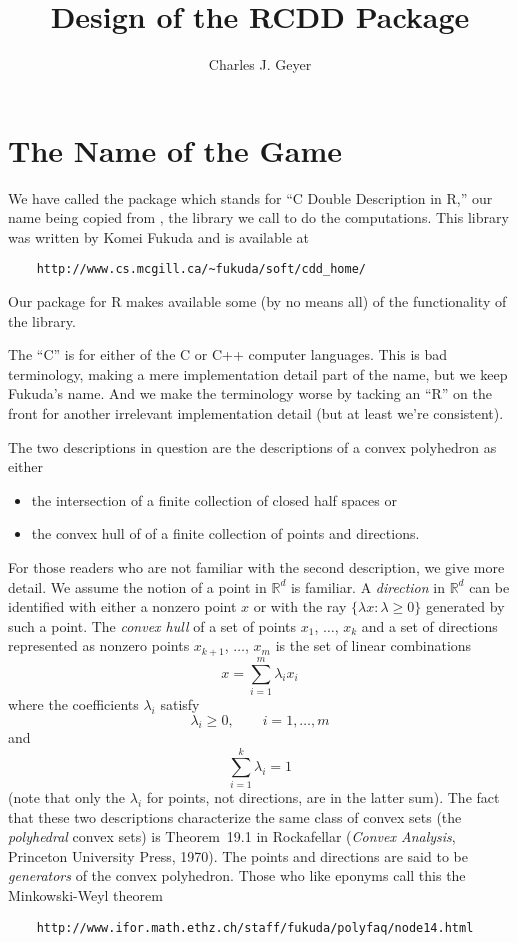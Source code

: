\documentclass{article}
\newcommand{\real}{\mathbb{R}}
\begin{document}
\title{Design of the RCDD Package}
\author{Charles J. Geyer}
\maketitle

\section{The Name of the Game}

We have called the package \verb@rcdd@ which stands
for ``C Double Description in R,'' our name being copied from
\verb@cddlib@, the library we call to do the computations.
This library was written by Komei Fukuda and is available at
\begin{verbatim}
    http://www.cs.mcgill.ca/~fukuda/soft/cdd_home/
\end{verbatim}
Our \verb@rcdd@ package for R makes available some
(by no means all) of the functionality
of the \verb@cddlib@ library.

The ``C'' is for either of the C or C++ computer languages.
This is bad terminology, making a mere implementation detail
part of the name, but we keep Fukuda's name.
And we make the terminology worse by tacking an ``R'' on the front
for another irrelevant implementation detail (but at least we're
consistent).

The two descriptions in question are the descriptions of a convex polyhedron
as either
\begin{itemize}
\item the intersection of a finite collection of closed half spaces or
\item the convex hull of of a finite collection of points and directions.
\end{itemize}

For those readers who are not familiar with the second description,
we give more detail.  We assume the notion of a point in $\real^d$
is familiar.  A \emph{direction} in $\real^d$ can be identified with
either a nonzero point $x$ or with
the ray $\{ \lambda x : \lambda \ge 0 \}$ generated by such a point.  
The \emph{convex hull} of a set of points $x_1$, $\ldots$, $x_k$ and
a set of directions represented as nonzero
points $x_{k + 1}$, $\ldots$, $x_m$ is the set of linear
combinations
$$
   x = \sum_{i = 1}^m \lambda_i x_i
$$
where the coefficients $\lambda_i$ satisfy
$$
   \lambda_i \ge 0, \qquad i = 1, \ldots, m
$$
and
$$
   \sum_{i = 1}^k \lambda_i = 1
$$
(note that only the $\lambda_i$ for points, not directions,
are in the latter sum).
The fact that these two descriptions characterize the same class of
convex sets (the \emph{polyhedral} convex sets) is Theorem~19.1
in Rockafellar (\emph{Convex Analysis}, Princeton University Press, 1970).
The points and directions are said to be \emph{generators} of the
convex polyhedron.  Those who like eponyms call this the
Minkowski-Weyl theorem
\begin{verbatim}
    http://www.ifor.math.ethz.ch/staff/fukuda/polyfaq/node14.html
\end{verbatim}
\end{document}
